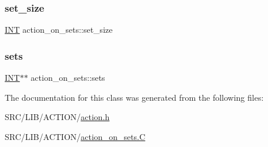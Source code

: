 \mbox{\label{classaction__on__sets_abfc32ee43a067df299af027da0fdd0be}} 
\subsubsection{\texorpdfstring{set\+\_\+size}{set\_size}}
{\footnotesize\ttfamily \mbox{\hyperlink{galois_8h_a09fddde158a3a20bd2dcadb609de11dc}{I\+NT}} action\+\_\+on\+\_\+sets\+::set\+\_\+size}

\mbox{\label{classaction__on__sets_ac42ac0622c5d0e65eb821f50c214164c}} 
\subsubsection{\texorpdfstring{sets}{sets}}
{\footnotesize\ttfamily \mbox{\hyperlink{galois_8h_a09fddde158a3a20bd2dcadb609de11dc}{I\+NT}}$\ast$$\ast$ action\+\_\+on\+\_\+sets\+::sets}



The documentation for this class was generated from the following files\+:\begin{DoxyCompactItemize}
\item 
S\+R\+C/\+L\+I\+B/\+A\+C\+T\+I\+O\+N/\mbox{\hyperlink{action_8h}{action.\+h}}\item 
S\+R\+C/\+L\+I\+B/\+A\+C\+T\+I\+O\+N/\mbox{\hyperlink{action__on__sets_8_c}{action\+\_\+on\+\_\+sets.\+C}}\end{DoxyCompactItemize}
